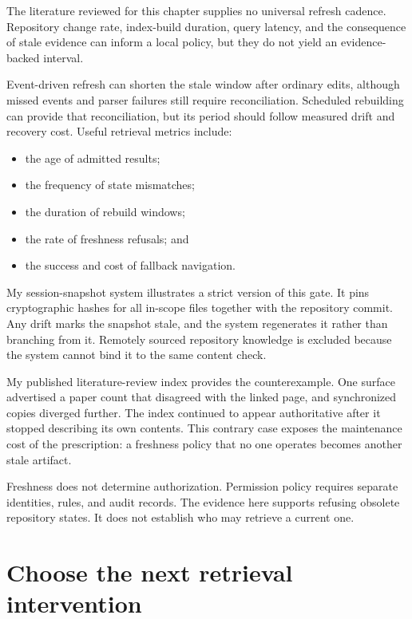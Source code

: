 The literature reviewed for this chapter supplies no universal refresh cadence. Repository change rate, index-build duration, query latency, and the consequence of stale evidence can inform a local policy, but they do not yield an evidence-backed interval.


Event-driven refresh can shorten the stale window after ordinary edits, although missed events and parser failures still require reconciliation. Scheduled rebuilding can provide that reconciliation, but its period should follow measured drift and recovery cost. Useful retrieval metrics include:

\begin{itemize}
\tightlist
\item
  the age of admitted results;
\item
  the frequency of state mismatches;
\item
  the duration of rebuild windows;
\item
  the rate of freshness refusals; and
\item
  the success and cost of fallback navigation.
\end{itemize}

My session-snapshot system illustrates a strict version of this gate. It pins cryptographic hashes for all in-scope files together with the repository commit. Any drift marks the snapshot stale, and the system regenerates it rather than branching from it. Remotely sourced repository knowledge is excluded because the system cannot bind it to the same content check.

My published literature-review index provides the counterexample. One surface advertised a paper count that disagreed with the linked page, and synchronized copies diverged further. The index continued to appear authoritative after it stopped describing its own contents. This contrary case exposes the maintenance cost of the prescription: a freshness policy that no one operates becomes another stale artifact.

Freshness does not determine authorization. Permission policy requires separate identities, rules, and audit records. The evidence here supports refusing obsolete repository states. It does not establish who may retrieve a current one.

\hypertarget{choose-the-next-retrieval-intervention}{%
\section{Choose the next retrieval intervention}\label{choose-the-next-retrieval-intervention}}


